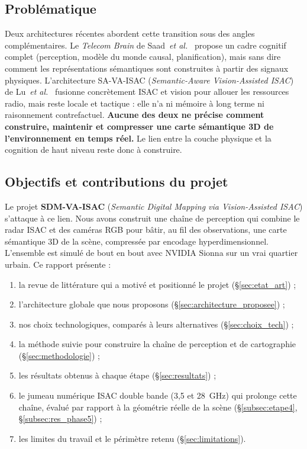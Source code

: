\documentclass[12pt,a4paper,titlepage]{article}
\begin{document}
\subsection{Problématique}

Deux architectures récentes abordent cette transition sous des angles complémentaires. Le \textit{Telecom Brain} de Saad~\textit{et al.}~\cite{saad2025} propose un cadre cognitif complet (perception, modèle du monde causal, planification), mais sans dire comment les représentations sémantiques sont construites à partir des signaux physiques. L'architecture SA-VA-ISAC (\textit{Semantic-Aware Vision-Assisted ISAC}) de Lu~\textit{et al.}~\cite{sa_va_isac_main} fusionne concrètement ISAC et vision pour allouer les ressources radio, mais reste locale et tactique : elle n'a ni mémoire à long terme ni raisonnement contrefactuel. \textbf{Aucune des deux ne précise comment construire, maintenir et compresser une carte sémantique 3D de l'environnement en temps réel.} Le lien entre la couche physique et la cognition de haut niveau reste donc à construire.

\subsection{Objectifs et contributions du projet}

Le projet \textbf{SDM-VA-ISAC} (\textit{Semantic Digital Mapping via Vision-Assisted ISAC}) s'attaque à ce lien. Nous avons construit une chaîne de perception qui combine le radar ISAC et des caméras RGB pour bâtir, au fil des observations, une carte sémantique 3D de la scène, compressée par encodage hyperdimensionnel. L'ensemble est simulé de bout en bout avec NVIDIA Sionna sur un vrai quartier urbain. Ce rapport présente :
\begin{enumerate}[leftmargin=1.5em]
    \item la revue de littérature qui a motivé et positionné le projet (\S\ref{sec:etat_art}) ;
    \item l'architecture globale que nous proposons (\S\ref{sec:architecture_proposee}) ;
    \item nos choix technologiques, comparés à leurs alternatives (\S\ref{sec:choix_tech}) ;
    \item la méthode suivie pour construire la chaîne de perception et de cartographie (\S\ref{sec:methodologie}) ;
    \item les résultats obtenus à chaque étape (\S\ref{sec:resultats}) ;
    \item le jumeau numérique ISAC double bande (3,5 et 28~GHz) qui prolonge cette chaîne, évalué par rapport à la géométrie réelle de la scène (\S\ref{subsec:etape4}, \S\ref{subsec:res_phase5}) ;
    \item les limites du travail et le périmètre retenu (\S\ref{sec:limitations}).
\end{enumerate}
\end{document}
